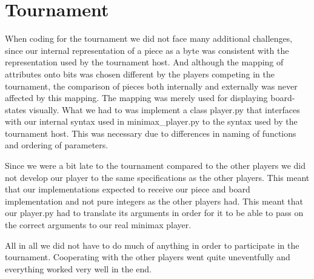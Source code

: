 \section{Tournament}\label{tournament}
When coding for the tournament we did not face many additional challenges, 
since our internal representation of a \quarto{} piece as a byte was 
consistent with the representation used by the tournament host. And although 
the mapping of attributes onto bits was chosen different by the players 
competing in the tournament, the comparison of pieces both internally and 
externally was never affected by this mapping. The mapping was merely used for 
displaying board-states visually.
What we had to was implement a class player.py that interfaces with our 
internal syntax used in minimax\_player.py to the syntax used by the 
tournament host. This was necessary due to differences in naming of functions 
and ordering of parameters.

Since we were a bit late to the tournament compared to the other players we did
not develop our player to the same specifications as the other players. This
meant that our implementations expected to receive our piece and board 
implementation and not pure integers as the other players had. This meant that
our player.py had to translate its arguments in order for it to be able
to pass on the correct arguments to our real minimax player.

All in all we did not have to do much of anything in order to participate in the
tournament. Cooperating with the other players went quite uneventfully and
everything worked very well in the end.
